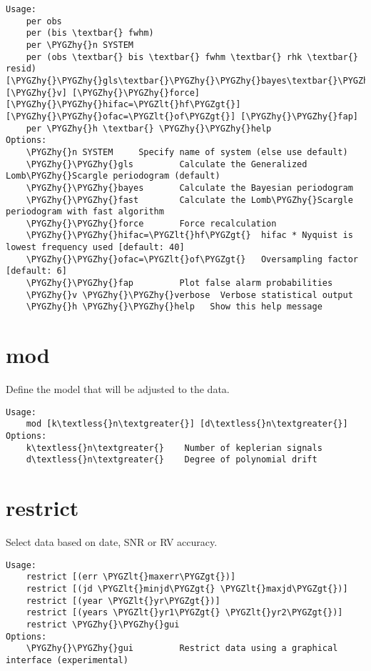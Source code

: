 \documentclass[letterpaper,10pt,english]{sphinxmanual}
\def\PYGZlt{\char`\<}
\def\PYGZgt{\char`\>}
\def\PYGZhy{\char`\-}
\begin{document}
\begin{Verbatim}[commandchars=\\\{\}]
Usage:
    per obs
    per (bis \textbar{} fwhm)
    per \PYGZhy{}n SYSTEM
    per (obs \textbar{} bis \textbar{} fwhm \textbar{} rhk \textbar{} resid) [\PYGZhy{}\PYGZhy{}gls\textbar{}\PYGZhy{}\PYGZhy{}bayes\textbar{}\PYGZhy{}\PYGZhy{}fast] [\PYGZhy{}v] [\PYGZhy{}\PYGZhy{}force] [\PYGZhy{}\PYGZhy{}hifac=\PYGZlt{}hf\PYGZgt{}] [\PYGZhy{}\PYGZhy{}ofac=\PYGZlt{}of\PYGZgt{}] [\PYGZhy{}\PYGZhy{}fap]
    per \PYGZhy{}h \textbar{} \PYGZhy{}\PYGZhy{}help
Options:
    \PYGZhy{}n SYSTEM     Specify name of system (else use default)
    \PYGZhy{}\PYGZhy{}gls         Calculate the Generalized Lomb\PYGZhy{}Scargle periodogram (default)
    \PYGZhy{}\PYGZhy{}bayes       Calculate the Bayesian periodogram
    \PYGZhy{}\PYGZhy{}fast        Calculate the Lomb\PYGZhy{}Scargle periodogram with fast algorithm
    \PYGZhy{}\PYGZhy{}force       Force recalculation
    \PYGZhy{}\PYGZhy{}hifac=\PYGZlt{}hf\PYGZgt{}  hifac * Nyquist is lowest frequency used [default: 40]
    \PYGZhy{}\PYGZhy{}ofac=\PYGZlt{}of\PYGZgt{}   Oversampling factor [default: 6]
    \PYGZhy{}\PYGZhy{}fap         Plot false alarm probabilities
    \PYGZhy{}v \PYGZhy{}\PYGZhy{}verbose  Verbose statistical output 
    \PYGZhy{}h \PYGZhy{}\PYGZhy{}help   Show this help message
\end{Verbatim}


\section{mod}
\label{commands:mod}
Define the model that will be adjusted to the data.

\begin{Verbatim}[commandchars=\\\{\}]
Usage:
    mod [k\textless{}n\textgreater{}] [d\textless{}n\textgreater{}]
Options:
    k\textless{}n\textgreater{}    Number of keplerian signals
    d\textless{}n\textgreater{}    Degree of polynomial drift
\end{Verbatim}


\section{restrict}
\label{commands:restrict}
Select data based on date, SNR or RV accuracy.

\begin{Verbatim}[commandchars=\\\{\}]
Usage:
    restrict [(err \PYGZlt{}maxerr\PYGZgt{})]
    restrict [(jd \PYGZlt{}minjd\PYGZgt{} \PYGZlt{}maxjd\PYGZgt{})]
    restrict [(year \PYGZlt{}yr\PYGZgt{})]
    restrict [(years \PYGZlt{}yr1\PYGZgt{} \PYGZlt{}yr2\PYGZgt{})]
    restrict \PYGZhy{}\PYGZhy{}gui
Options:
    \PYGZhy{}\PYGZhy{}gui         Restrict data using a graphical interface (experimental)
\end{Verbatim}
\end{document}
